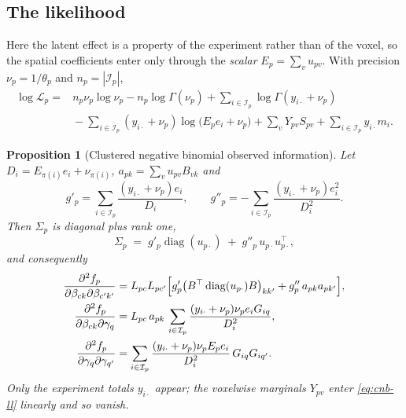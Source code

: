 \documentclass[11pt,a4paper]{article}
\theoremstyle{plain}
\newtheorem{proposition}{Proposition}
\theoremstyle{definition}
\newcommand{\E}{\mathcal{I}}
\newcommand{\diag}{\operatorname{diag}}
\begin{document}
\subsection{The likelihood}

Here the latent effect is a property of the experiment rather than of the voxel, so the spatial
coefficients enter only through the \emph{scalar} $E_p = \sum_v u_{pv}$. With precision
$\nu_p = 1/\theta_p$ and $n_p = |\E_p|$,
\begin{equation}\label{eq:cnb-ll}
\begin{split}
  \log\mathcal{L}_p ={}& n_p \nu_p \log \nu_p - n_p\log\Gamma(\nu_p)
   + \sum_{i\in\E_p}\log\Gamma(y_{i\cdot}+\nu_p)\\
   &{}- \sum_{i\in\E_p}(y_{i\cdot}+\nu_p)\log\bigl(E_p e_i + \nu_p\bigr)
   + \sum_v Y_{pv}S_{pv} + \sum_{i\in\E_p} y_{i\cdot} m_i .
\end{split}
\end{equation}

\begin{proposition}[Clustered negative binomial observed information]\label{prop:cnb}
Let $D_i = E_{\pi(i)} e_i + \nu_{\pi(i)}$, $a_{pk} = \sum_v u_{pv}B_{vk}$ and
\[
  g'_p = \sum_{i\in\E_p} \frac{(y_{i\cdot}+\nu_p)e_i}{D_i},
  \qquad
  g''_p = -\sum_{i\in\E_p} \frac{(y_{i\cdot}+\nu_p)e_i^2}{D_i^2} .
\]
Then $\Sigma_p$ is diagonal plus rank one,
\begin{equation}\label{eq:cnb-sigma}
  \Sigma_p \;=\; g'_p \diag(u_{p\cdot}) \;+\; g''_p\, u_{p\cdot} u_{p\cdot}^\top ,
\end{equation}
and consequently
\begin{align}
  \frac{\partial^2 f_p}{\partial\beta_{ck}\partial\beta_{c'k'}}
   &= L_{pc}L_{pc'}\Bigl[g'_p\bigl(B^\top\diag(u_{p\cdot})B\bigr)_{kk'}
      + g''_p\, a_{pk}a_{pk'}\Bigr],\\
  \frac{\partial^2 f_p}{\partial\beta_{ck}\partial\gamma_q}
   &= L_{pc}\, a_{pk}\, \sum_{i\in\E_p}\frac{(y_{i\cdot}+\nu_p)\nu_p e_i G_{iq}}{D_i^2},\\
  \frac{\partial^2 f_p}{\partial\gamma_q\partial\gamma_{q'}}
   &= \sum_{i\in\E_p}\frac{(y_{i\cdot}+\nu_p)\nu_p E_p e_i}{D_i^2}\,G_{iq}G_{iq'} .
\end{align}
Only the experiment totals $y_{i\cdot}$ appear; the voxelwise marginals $Y_{pv}$ enter
\eqref{eq:cnb-ll} linearly and so vanish.
\end{proposition}
\end{document}
